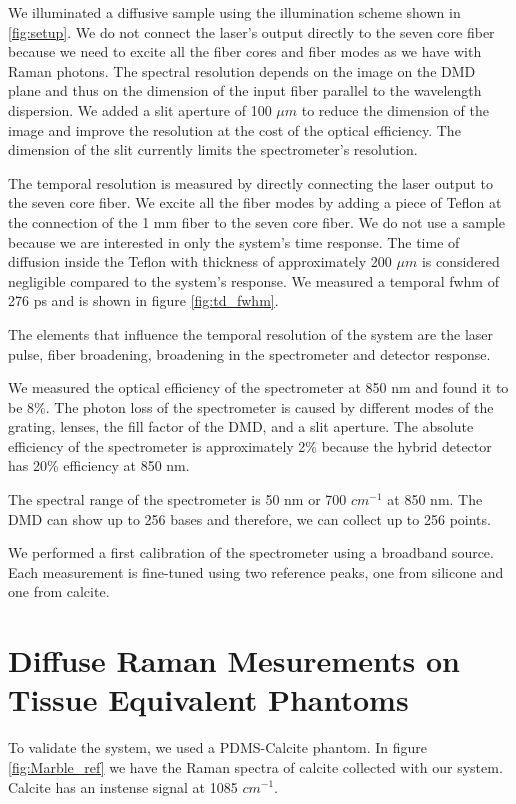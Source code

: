 \documentclass{osa-article}
\begin{document}
We illuminated a diffusive sample using the illumination scheme shown in \ref{fig:setup}. We do not connect the laser's output directly to the seven core fiber because we need to excite all the fiber cores and fiber modes as we have with Raman photons.
The spectral resolution depends on the image on the DMD plane and thus on the dimension of the input fiber parallel to the wavelength dispersion.
We added a slit aperture of 100 $\mu m$ to reduce the dimension of the image and improve the resolution at the cost of the optical efficiency.
The dimension of the slit currently limits the spectrometer's resolution.

The temporal resolution is measured by directly connecting the laser output to the seven core fiber. We excite all the fiber modes by adding a piece of Teflon at the connection of the 1 mm fiber to the seven core fiber.
We do not use a sample because we are interested in only the system's time response. The time of diffusion inside the Teflon with thickness of approximately 200 $\mu m$ is considered negligible compared to the system's response. We measured a temporal fwhm of 276 ps and is shown in figure \ref{fig:td_fwhm}. 

The elements that influence the temporal resolution of the system are the laser pulse, fiber broadening, broadening in the spectrometer and detector response.

We measured the optical efficiency of the spectrometer at 850 nm and found it to be 8\%. The photon loss of the spectrometer is caused by different modes of the grating, lenses, the fill factor of the DMD, and a slit aperture. The absolute efficiency of the spectrometer is approximately 2\% because the hybrid detector has 20\% efficiency at 850 nm.

The spectral range of the spectrometer is 50 nm or 700 $cm^{-1}$ at 850 nm.
The DMD can show up to 256 bases and therefore, we can collect up to 256 points.

We performed a first calibration of the spectrometer using a broadband source. 
Each measurement is fine-tuned using two reference peaks, one from silicone and one from calcite.


\section{Diffuse Raman Mesurements on Tissue Equivalent Phantoms}
To validate the system, we used a PDMS-Calcite phantom.
In figure \ref{fig:Marble_ref} we have the Raman spectra of calcite collected with our system. Calcite has an instense signal at 1085 $cm^{-1}$.
\end{document}
